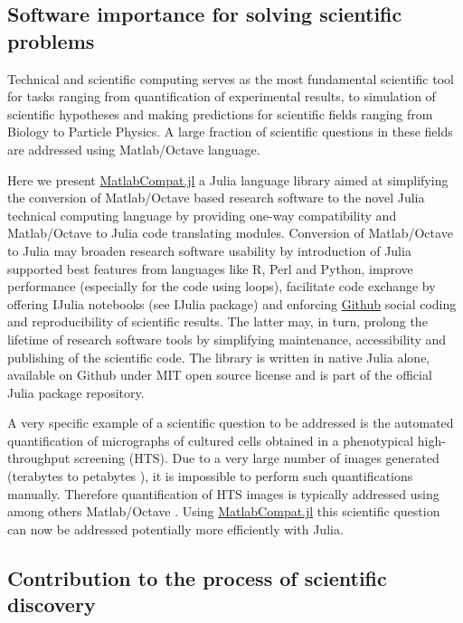 \subsection{Software importance for solving scientific problems}

Technical and scientific computing serves as the most fundamental scientific tool for tasks ranging from quantification of experimental results, to simulation of scientific hypotheses and making predictions for scientific fields ranging from Biology to Particle Physics. A large fraction of scientific questions in these fields are addressed using Matlab/Octave language.

Here we present \href{https://github.com/MatlabCompat/MatlabCompat.jl}{MatlabCompat.jl} a Julia language library aimed at simplifying the conversion of Matlab/Octave based research software to the novel Julia technical computing language by providing one-way compatibility and Matlab/Octave to Julia code translating modules. Conversion of Matlab/Octave to Julia may broaden research software usability by introduction of Julia supported best features from languages like R, Perl and Python, improve performance (especially for the code using loops), facilitate code exchange by offering IJulia notebooks (see IJulia package) and enforcing \href{http://github.com}{Github} social coding  and reproducibility of scientific results. The latter may, in turn, prolong the lifetime of research software tools by simplifying maintenance, accessibility and publishing of the scientific code. The library is written in native Julia alone, available on Github under MIT open source license and is part of the official Julia package repository.

A very specific example of a scientific question to be addressed is the automated quantification of micrographs of cultured cells obtained in  a phenotypical high-throughput screening (HTS). Due to a very large number of images generated (terabytes to petabytes \cite{R_m__2014}), it is impossible to perform such quantifications manually. Therefore quantification of HTS images is typically addressed using among others Matlab/Octave \cite{22787215, 17076895, R_m__2014}. Using \href{https://github.com/MatlabCompat/MatlabCompat.jl}{MatlabCompat.jl} this scientific question can now be addressed potentially more efficiently with Julia.

\subsection{Contribution to the process of scientific discovery}

